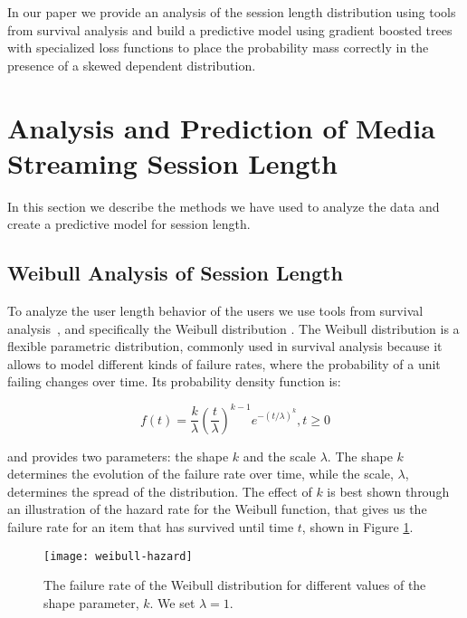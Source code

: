 In our paper we provide an analysis of the session length distribution using
tools from survival analysis and build a predictive model using gradient boosted trees with specialized
loss functions to place the probability mass correctly in the presence of a
skewed dependent distribution.

\section{Analysis and Prediction of Media Streaming Session Length}
\label{sec:session-length-method}

In this section we describe the methods we have used to analyze the data
and create a predictive model for session length.

\subsection{Weibull Analysis of Session Length}

To analyze the user length behavior of the users we use tools from survival analysis~\cite{survival-analysis}, and specifically the Weibull distribution
\cite{weibull-survival}. The Weibull distribution is a flexible parametric distribution,
commonly used in survival analysis because it allows to model different kinds of failure
rates, where the probability of a unit failing changes over time. Its probability
density function is:

\begin{equation}
\label{eq:weibull-pdf}
f(t) = \frac{k}{\lambda}\left( \frac{t}{\lambda}\right)^{k-1}e^{-(t/\lambda)^k}, t \geq 0
\end{equation}


\noindent
and provides two parameters: the shape $k$ and the scale $\lambda$. The shape $k$ determines
the evolution of the failure rate over time, while the scale, $\lambda$, determines the spread
of the distribution. The effect of $k$ is best shown through an illustration of the hazard rate
for the Weibull function, that gives us the failure rate for an item that has survived until time
$t$, shown in Figure \ref{fig:weibull-failure-rate}.

\begin{figure}
	\centering
	\texttt{[image: weibull-hazard]}
	\caption{The failure rate of the Weibull distribution for different values of the shape parameter, $k$. We set $\lambda = 1$.}
	\label{fig:weibull-failure-rate}
\end{figure}

